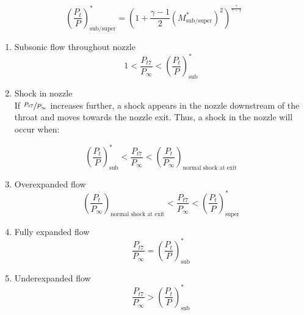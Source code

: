 \documentclass{article}
\begin{document}
\begin{equation}
\left( \frac{P_t}{P} \right)_{\textrm{sub/super}}^* = \left( 1 + \frac{\gamma - 1}{2} \left(M_{\textrm{sub/super}}^*\right)^2 \right)^\frac{\gamma}{\gamma - 1}
\end{equation}

\begin{enumerate}
\item Subsonic flow throughout nozzle \\ 

\begin{equation*}
1 < \frac{P_{t7}}{P_{\infty}} < \left( \frac{P_t}{P} \right)_{\textrm{sub}}^*
\end{equation*}

\item Shock in nozzle \\ 

If $\sfrac{P_{t7}}{P_{\infty}}$ increases further, a shock appears in the nozzle downstream of the throat and moves towards the nozzle exit. Thus, a shock in the nozzle will occur when:

\begin{equation*}
\left( \frac{P_t}{P} \right)_{\textrm{sub}}^* < \frac{P_{t7}}{P_{\infty}} < \left( \frac{P_t}{P_{\infty}} \right)_{\textrm{normal shock at exit}}
\end{equation*}

\item Overexpanded flow \\

\begin{equation*}
\left( \frac{P_t}{P_{\infty}} \right)_{\textrm{normal shock at exit}} < \frac{P_{t7}}{P_{\infty}} < \left( \frac{P_t}{P} \right)_{\textrm{super}}^*
\end{equation*}

\item Fully expanded flow \\

\begin{equation*}
\frac{P_{t7}}{P_{\infty}} = \left( \frac{P_t}{P} \right)_{\textrm{sub}}^*
\end{equation*}

\item Underexpanded flow \\

\begin{equation*}
\frac{P_{t7}}{P_{\infty}} > \left( \frac{P_t}{P} \right)_{\textrm{sub}}^*
\end{equation*}

\end{enumerate}
\end{document}
